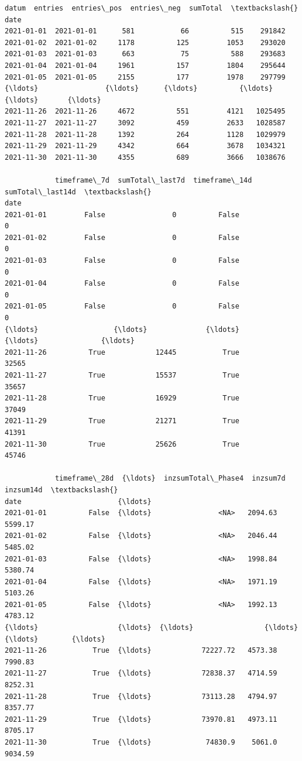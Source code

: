 \documentclass[11pt]{article}
\begin{document}
            \begin{tcolorbox}[breakable, size=fbox, boxrule=.5pt, pad at break*=1mm, opacityfill=0]
\begin{Verbatim}[commandchars=\\\{\}]
                 datum  entries  entries\_pos  entries\_neg  sumTotal  \textbackslash{}
date
2021-01-01  2021-01-01      581           66          515    291842
2021-01-02  2021-01-02     1178          125         1053    293020
2021-01-03  2021-01-03      663           75          588    293683
2021-01-04  2021-01-04     1961          157         1804    295644
2021-01-05  2021-01-05     2155          177         1978    297799
{\ldots}                {\ldots}      {\ldots}          {\ldots}          {\ldots}       {\ldots}
2021-11-26  2021-11-26     4672          551         4121   1025495
2021-11-27  2021-11-27     3092          459         2633   1028587
2021-11-28  2021-11-28     1392          264         1128   1029979
2021-11-29  2021-11-29     4342          664         3678   1034321
2021-11-30  2021-11-30     4355          689         3666   1038676

            timeframe\_7d  sumTotal\_last7d  timeframe\_14d  sumTotal\_last14d  \textbackslash{}
date
2021-01-01         False                0          False                 0
2021-01-02         False                0          False                 0
2021-01-03         False                0          False                 0
2021-01-04         False                0          False                 0
2021-01-05         False                0          False                 0
{\ldots}                  {\ldots}              {\ldots}            {\ldots}               {\ldots}
2021-11-26          True            12445           True             32565
2021-11-27          True            15537           True             35657
2021-11-28          True            16929           True             37049
2021-11-29          True            21271           True             41391
2021-11-30          True            25626           True             45746

            timeframe\_28d  {\ldots}  inzsumTotal\_Phase4  inzsum7d  inzsum14d  \textbackslash{}
date                       {\ldots}
2021-01-01          False  {\ldots}                <NA>   2094.63    5599.17
2021-01-02          False  {\ldots}                <NA>   2046.44    5485.02
2021-01-03          False  {\ldots}                <NA>   1998.84    5380.74
2021-01-04          False  {\ldots}                <NA>   1971.19    5103.26
2021-01-05          False  {\ldots}                <NA>   1992.13    4783.12
{\ldots}                   {\ldots}  {\ldots}                 {\ldots}       {\ldots}        {\ldots}
2021-11-26           True  {\ldots}            72227.72   4573.38    7990.83
2021-11-27           True  {\ldots}            72838.37   4714.59    8252.31
2021-11-28           True  {\ldots}            73113.28   4794.97    8357.77
2021-11-29           True  {\ldots}            73970.81   4973.11    8705.17
2021-11-30           True  {\ldots}             74830.9    5061.0    9034.59


\end{Verbatim}
\end{tcolorbox}
\end{document}
